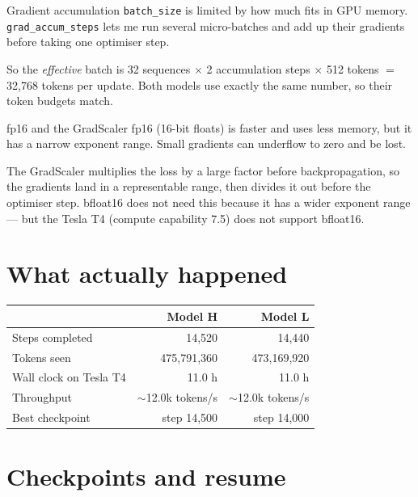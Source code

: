 \documentclass[11pt]{report}
\newcommand{\p}[1]{\texttt{#1}}
\begin{document}
\begin{concept}{Gradient accumulation}
\p{batch\_size} is limited by how much fits in GPU memory. \p{grad\_accum\_steps}
lets me run several micro-batches and add up their gradients before taking one
optimiser step.

So the \emph{effective} batch is 32 sequences $\times$ 2 accumulation steps
$\times$ 512 tokens $=$ 32,768 tokens per update. Both models use exactly the
same number, so their token budgets match.
\end{concept}

\begin{concept}{fp16 and the GradScaler}
fp16 (16-bit floats) is faster and uses less memory, but it has a narrow
exponent range. Small gradients can underflow to zero and be lost.

The GradScaler multiplies the loss by a large factor before backpropagation, so
the gradients land in a representable range, then divides it out before the
optimiser step. bfloat16 does not need this because it has a wider exponent
range --- but the Tesla T4 (compute capability 7.5) does not support bfloat16.
\end{concept}

\section{What actually happened}

\begin{center}
\begin{tabular}{@{}lrr@{}}
\toprule
 & \textbf{Model H} & \textbf{Model L} \\
\midrule
Steps completed & 14,520 & 14,440 \\
Tokens seen & 475,791,360 & 473,169,920 \\
Wall clock on Tesla T4 & 11.0 h & 11.0 h \\
Throughput & $\sim$12.0k tokens/s & $\sim$12.0k tokens/s \\
Best checkpoint & step 14,500 & step 14,000 \\
\bottomrule
\end{tabular}
\end{center}

\section{Checkpoints and resume}
\end{document}
